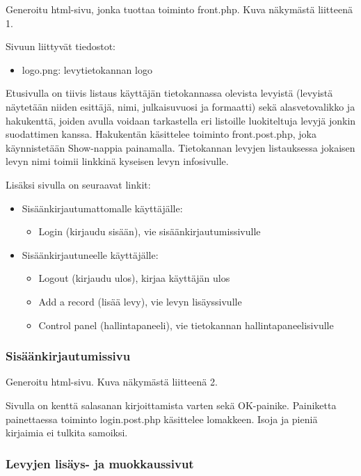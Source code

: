 \documentclass[a4paper,12pt]{report}
\begin{document}
Generoitu html-sivu, jonka tuottaa toiminto front.php. Kuva näkymästä
liitteenä 1.

Sivuun liittyvät tiedostot:
\begin{itemize}
  \item logo.png: levytietokannan logo
\end{itemize}

Etusivulla on tiivis listaus käyttäjän tietokannassa olevista levyistä
(levyistä näytetään niiden esittäjä, nimi, julkaisuvuosi ja formaatti) sekä
alasvetovalikko ja hakukenttä, joiden avulla voidaan tarkastella eri
listoille luokiteltuja levyjä jonkin suodattimen kanssa.  Hakukentän
käsittelee toiminto front.post.php, joka käynnistetään Show-nappia
painamalla.  Tietokannan levyjen listauksessa jokaisen levyn nimi toimii
linkkinä kyseisen levyn infosivulle.

Lisäksi sivulla on seuraavat linkit:

\begin{itemize}
  \item Sisäänkirjautumattomalle käyttäjälle:
    \begin{itemize}
	    \item Login (kirjaudu sisään),
		    vie sisäänkirjautumissivulle
    \end{itemize}

  \item Sisäänkirjautuneelle käyttäjälle:
    \begin{itemize}
	    \item Logout (kirjaudu ulos),
		    kirjaa käyttäjän ulos
	    \item Add a record (lisää levy),
		    vie levyn lisäyssivulle
	    \item Control panel (hallintapaneeli),
		    vie tietokannan hallintapaneelisivulle
    \end{itemize}
\end{itemize}

\subsubsection{Sisäänkirjautumissivu}

Generoitu html-sivu. Kuva näkymästä liitteenä 2.

Sivulla on kenttä salasanan kirjoittamista varten sekä OK-painike.
Painiketta painettaessa toiminto login.post.php käsittelee lomakkeen.  Isoja
ja pieniä kirjaimia ei tulkita samoiksi.

\subsubsection{Levyjen lisäys- ja muokkaussivut}
\end{document}

